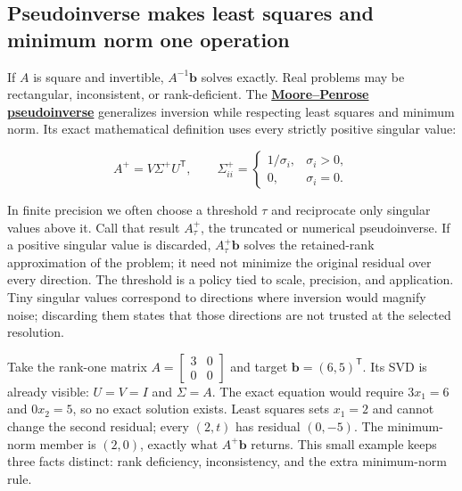 \subsection{Pseudoinverse makes least squares and minimum norm one operation}\label{02-foundations-ii-ch024-pseudoinverse-makes-least-squares-and-minimum-norm-one-operation}

\hypertarget{02-foundations-ii-ch024-pseudoinverse-makes-least-squares-and-minimum-norm-one-operation}{}

If \(A\) is square and invertible, \(A^{-1}\mathbf b\) solves exactly. Real problems may be rectangular, inconsistent, or rank-deficient. The \textbf{\hyperref[02-foundations-ii-ch024-the-moorepenrose-inverse-and-its-four-identities]{Moore--Penrose pseudoinverse}} generalizes inversion while respecting least squares and minimum norm. Its exact mathematical definition uses every strictly positive singular value:

\[
A^+=V\Sigma^+U^\mathsf T,
\qquad
\Sigma^+_{ii}=\begin{cases}1/\sigma_i,&\sigma_i>0,\\0,&\sigma_i=0.\end{cases}
\]

In finite precision we often choose a threshold \(\tau\) and reciprocate only singular values above it. Call that result \(A_\tau^+\), the truncated or numerical pseudoinverse. If a positive singular value is discarded, \(A_\tau^+\mathbf b\) solves the retained-rank approximation of the problem; it need not minimize the original residual over every direction. The threshold is a policy tied to scale, precision, and application. Tiny singular values correspond to directions where inversion would magnify noise; discarding them states that those directions are not trusted at the selected resolution.

Take the rank-one matrix \(A=\begin{bmatrix}3&0\\0&0\end{bmatrix}\) and target \(\mathbf b=(6,5)^\mathsf T\). Its SVD is already visible: \(U=V=I\) and \(\Sigma=A\). The exact equation would require \(3x_1=6\) and \(0x_2=5\), so no exact solution exists. Least squares sets \(x_1=2\) and cannot change the second residual; every \((2,t)\) has residual \((0,-5)\). The minimum-norm member is \((2,0)\), exactly what \(A^+\mathbf b\) returns. This small example keeps three facts distinct: rank deficiency, inconsistency, and the extra minimum-norm rule.

